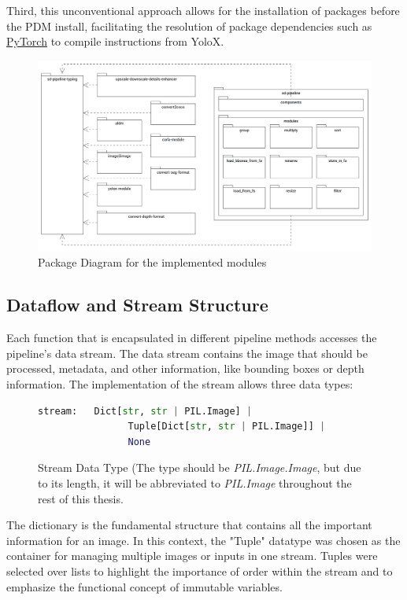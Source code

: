 Third, this unconventional approach allows for the installation of packages before the PDM install, facilitating the resolution of package dependencies such as \href{https://github.com/pytorch/pytorch}{PyTorch} to compile instructions from YoloX.

\begin{figure}[H]
  \centering
  \includegraphics[width=\textwidth]{figures/own_work/pipeline/package_diagram.pdf}
  \caption{Package Diagram for the implemented modules}
  \label{fig:package_diagram_sd_pipeline}
  \clearpage
\end{figure}

\subsection{Dataflow and Stream Structure}

Each function that is encapsulated in different pipeline methods accesses the pipeline's data stream. The data stream contains the image that should be processed, metadata, and other information, like bounding boxes or depth information. The implementation of the stream allows three data types: 
    
\begin{figure}[H]
\begin{lstlisting}[language=Python]
      stream:   Dict[str, str | PIL.Image] |
                Tuple[Dict[str, str | PIL.Image]] | 
                None
\end{lstlisting}
\caption{Stream Data Type (The type should be \textit{PIL.Image.Image}, but due to its length, it will be abbreviated to \textit{PIL.Image} throughout the rest of this thesis.}
\end{figure}

The dictionary is the fundamental structure that contains all the important information for an image. In this context, the "Tuple" datatype was chosen as the container for managing multiple images or inputs in one stream. Tuples were selected over lists to highlight the importance of order within the stream and to emphasize the functional concept of immutable variables.


